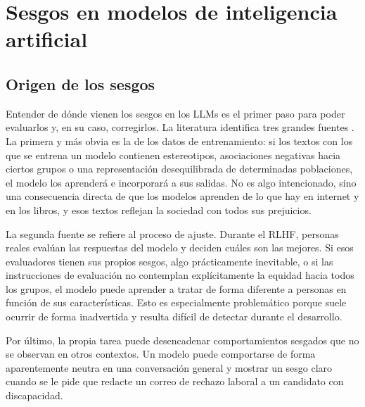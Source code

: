 \documentclass[12pt]{report} %
\renewcommand{\_}{\oldunderscore\allowbreak}
\begin{document}
\section{Sesgos en modelos de inteligencia artificial}

\subsection{Origen de los sesgos}
Entender de dónde vienen los sesgos en los LLMs es el primer paso para poder evaluarlos y, en su caso, corregirlos. La literatura identifica tres grandes fuentes \cite{navigli2023biases, guo2024bias}. La primera y más obvia es la de los datos de entrenamiento: si los textos con los que se entrena un modelo contienen estereotipos, asociaciones negativas hacia ciertos grupos o una representación desequilibrada de determinadas poblaciones, el modelo los aprenderá e incorporará a sus salidas. No es algo intencionado, sino una consecuencia directa de que los modelos aprenden de lo que hay en internet y en los libros, y esos textos reflejan la sociedad con todos sus prejuicios.

La segunda fuente se refiere al proceso de ajuste. Durante el RLHF, personas reales evalúan las respuestas del modelo y deciden cuáles son las mejores. Si esos evaluadores tienen sus propios sesgos, algo prácticamente inevitable, o si las instrucciones de evaluación no contemplan explícitamente la equidad hacia todos los grupos, el modelo puede aprender a tratar de forma diferente a personas en función de sus características. Esto es especialmente problemático porque suele ocurrir de forma inadvertida y resulta difícil de detectar durante el desarrollo.

Por último, la propia tarea puede desencadenar comportamientos sesgados que no se observan en otros contextos. Un modelo puede comportarse de forma aparentemente neutra en una conversación general y mostrar un sesgo claro cuando se le pide que redacte un correo de rechazo laboral a un candidato con discapacidad.

\end{document}

